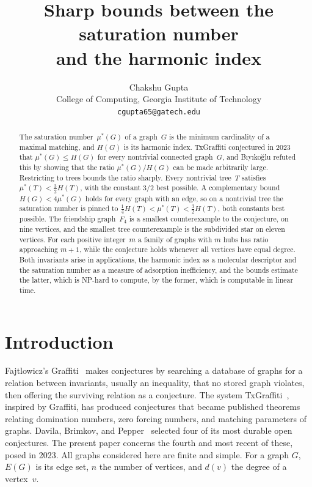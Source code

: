 \documentclass[11pt]{article}
\title{Sharp bounds between the saturation number\\
       and the harmonic index}
\author{Chakshu Gupta\\[2pt]
  {\small College of Computing, Georgia Institute of Technology}\\
  {\small \texttt{cgupta65@gatech.edu}}}
\date{}
\theoremstyle{definition}
\theoremstyle{remark}
\newcommand{\mustar}{\mu^{*}}
\begin{document}
\maketitle

\begin{abstract}
The saturation number~$\mustar(G)$ of a graph~$G$ is the minimum cardinality
of a maximal matching, and $H(G)$ is its harmonic index.  TxGraffiti conjectured
in 2023 that $\mustar(G) \le H(G)$ for every nontrivial connected graph~$G$, and
B\i y\i ko\u{g}lu refuted this by showing that the ratio $\mustar(G)/H(G)$ can
be made arbitrarily large.  Restricting to trees bounds the ratio sharply.
Every nontrivial tree~$T$ satisfies $\mustar(T) < \tfrac{3}{2} H(T)$, with the
constant $3/2$ best possible.  A complementary bound $H(G) < 4\mustar(G)$ holds
for every graph with an edge, so on a nontrivial tree the saturation number is
pinned to $\tfrac14 H(T) < \mustar(T) < \tfrac{3}{2} H(T)$, both constants best
possible.  The friendship graph~$F_4$ is a smallest counterexample to the
conjecture, on nine vertices, and the smallest tree counterexample is the
subdivided star on eleven vertices.  For each positive integer~$m$ a family of
graphs with $m$ hubs has ratio approaching $m+1$, while the conjecture holds
whenever all vertices have equal degree.  Both invariants arise in applications,
the harmonic index as a molecular descriptor and the saturation number as a
measure of adsorption inefficiency, and the bounds estimate the latter, which is
NP-hard to compute, by the former, which is computable in linear time.
\end{abstract}

\section{Introduction}\label{sec:intro}

Fajtlowicz's Graffiti~\cite{Fajtlowicz1988graffiti} makes conjectures by
searching a database of graphs for a relation between invariants, usually an
inequality, that no stored graph violates, then offering the surviving
relation as a conjecture.  The system TxGraffiti~\cite{Davila2026automated},
inspired by Graffiti, has produced conjectures that became published theorems
relating domination numbers, zero forcing numbers, and matching parameters of
graphs.  Davila, Brimkov, and Pepper~\cite{Davila2025reverie} selected
four of its most durable open conjectures.  The present paper concerns the
fourth and most recent of these, posed in 2023.  All graphs considered here
are finite and simple.  For a graph $G$, $E(G)$ is its edge set, $n$ the
number of vertices, and $d(v)$ the degree of a vertex~$v$.
\end{document}

